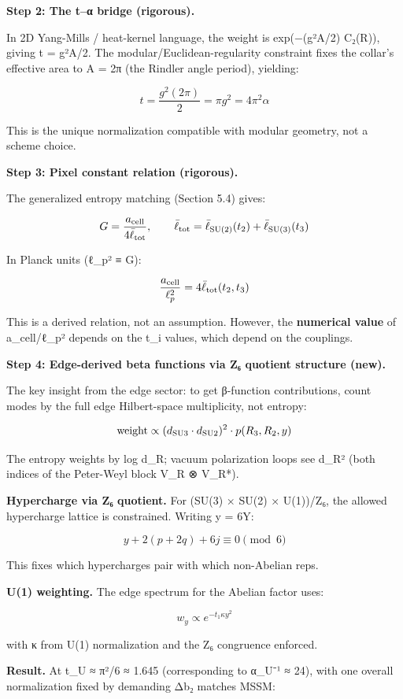 \documentclass[
]{article}
\begin{document}
\textbf{Step 2: The t--α bridge (rigorous).}

In 2D Yang-Mills / heat-kernel language, the weight is exp(−(g²A/2)
C₂(R)), giving t = g²A/2. The modular/Euclidean-regularity constraint
fixes the collar's effective area to A = 2π (the Rindler angle period),
yielding:

\[
t = \frac{g^2(2\pi)}{2} = \pi g^2 = 4\pi^2 \alpha
\]

This is the unique normalization compatible with modular geometry, not a
scheme choice.

\textbf{Step 3: Pixel constant relation (rigorous).}

The generalized entropy matching (Section 5.4) gives:

\[
G = \frac{a_{\rm cell}}{4\bar{\ell}_{\rm tot}}, \qquad
\bar{\ell}_{\rm tot} = \bar{\ell}_{\rm SU(2)}(t_2) + \bar{\ell}_{\rm SU(3)}(t_3)
\]

In Planck units (ℓ\_p² ≡ G):

\[
\frac{a_{\rm cell}}{\ell_p^2} = 4\bar{\ell}_{\rm tot}(t_2, t_3)
\]

This is a derived relation, not an assumption. However, the
\textbf{numerical value} of a\_cell/ℓ\_p² depends on the t\_i values,
which depend on the couplings.

\textbf{Step 4: Edge-derived beta functions via Z₆ quotient structure
(new).}

The key insight from the edge sector: to get β-function contributions,
count modes by the full edge Hilbert-space multiplicity, not entropy:

\[
\text{weight} \propto (d_{\rm SU3} \cdot d_{\rm SU2})^2 \cdot p(R_3, R_2, y)
\]

The entropy weights by log d\_R; vacuum polarization loops see d\_R²
(both indices of the Peter-Weyl block V\_R ⊗ V\_R*).

\textbf{Hypercharge via Z₆ quotient.} For (SU(3) × SU(2) × U(1))/Z₆, the
allowed hypercharge lattice is constrained. Writing y = 6Y:

\[
y + 2(p + 2q) + 6j \equiv 0 \pmod{6}
\]

This fixes which hypercharges pair with which non-Abelian reps.

\textbf{U(1) weighting.} The edge spectrum for the Abelian factor uses:

\[
w_y \propto e^{-t_1 \kappa y^2}
\]

with κ from U(1) normalization and the Z₆ congruence enforced.

\textbf{Result.} At t\_U ≈ π²/6 ≈ 1.645 (corresponding to α\_U⁻¹ ≈ 24),
with one overall normalization fixed by demanding Δb₂ matches MSSM:
\end{document}
